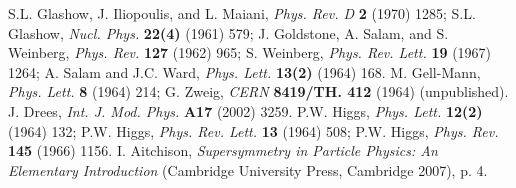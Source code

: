 \documentclass[12pt, letterpaper]{report}
\begin{document}
\begin{thebibliography}{99}


 S.L. Glashow, J. Iliopoulis, and L. Maiani, \textit{Phys. Rev. D} \textbf{2} (1970) 1285; S.L. Glashow, \textit{Nucl. Phys.} \textbf{22(4)} (1961) 579; J. Goldstone, A. Salam, and S. Weinberg, \textit{Phys. Rev.} \textbf{127} (1962) 965; S. Weinberg, \textit{Phys. Rev. Lett.} \textbf{19} (1967) 1264; A. Salam and J.C. Ward, \textit{Phys. Lett.} \textbf{13(2)} (1964) 168.
 M. Gell-Mann, \textit{Phys. Lett.} \textbf{8} (1964) 214; G. Zweig, \textit{CERN} \textbf{8419/TH. 412} (1964) (unpublished).
 J. Drees, \textit{Int. J. Mod. Phys.} \textbf{A17} (2002) 3259.
 P.W. Higgs, \textit{Phys. Lett.} \textbf{12(2)} (1964) 132; P.W. Higgs, \textit{Phys. Rev. Lett.} \textbf{13} (1964) 508; P.W. Higgs, \textit{Phys. Rev.} \textbf{145} (1966) 1156.
 I. Aitchison, \textit{Supersymmetry in Particle Physics: An Elementary Introduction} (Cambridge University Press, Cambridge 2007), p. 4.



\end{thebibliography}
\end{document}
